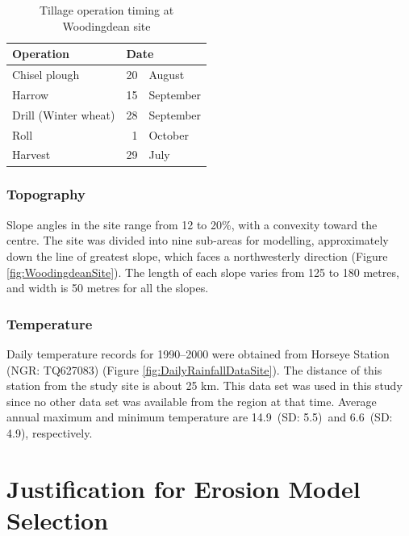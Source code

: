 \begin{table}[htbp]
  \centering
  \caption[Tillage operation timing at Woodingdean site]{Tillage operation
timing at Woodingdean site \citep[From][]{favis-mortlock1998-141}}
  \label{tab:TillageOperationTiming}
    \small
    \begin{tabular}{lr@{ }l}
      \toprule
      \textbf{Operation} & \multicolumn{2}{l}{\textbf{Date}}\\
      \midrule
      Chisel plough & 20 & August\\
      Harrow & 15 & September\\
      Drill (Winter wheat) & 28 & September\\
      Roll & 1 & October\\
      Harvest & 29 & July\\
      \bottomrule
    \end{tabular}
\end{table}

\subsubsection{Topography}
\label{sec:TopographyData}
Slope angles in the site range from 12 to 20\%, with a convexity toward the
centre. The site was divided into nine sub-areas for modelling, approximately
down the line of greatest slope, which faces a northwesterly direction (Figure
\ref{fig:WoodingdeanSite}). The length of each slope varies from 125 to 180
metres, and width is 50 metres for all the slopes.

\subsubsection{Temperature}
\label{sec:Temperature}

Daily temperature records for 1990--2000 were obtained from Horseye Station
(NGR: TQ627083) (Figure \ref{fig:DailyRainfallDataSite}). The distance of this
station from the study site is about 25 km. This data set was used in this study
since no other data set was available from the region at that time. Average
annual maximum and minimum temperature are 14.9\textcelsius\ (SD:
5.5\textcelsius)\ and 6.6\textcelsius\ (SD: 4.9\textcelsius), respectively.

\section{Justification for Erosion Model Selection}
\label{sec:ModelConfiguration}


